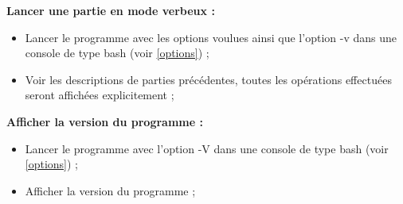 \documentclass[10pt,a4paper]{article}
\begin{document}
\textbf{Lancer une partie en mode verbeux :}
\begin{itemize}
\item Lancer le programme avec les options voulues ainsi que l'option -v dans une console de type bash (voir \ref{options}) ;
\item Voir les descriptions de parties précédentes, toutes les opérations effectuées seront affichées explicitement ;\\
\end{itemize}

\textbf{Afficher la version du programme :}
\begin{itemize}
\item Lancer le programme avec l'option -V dans une console de type bash (voir \ref{options}) ;
\item Afficher la version du programme ;
\end{itemize}
\end{document}
